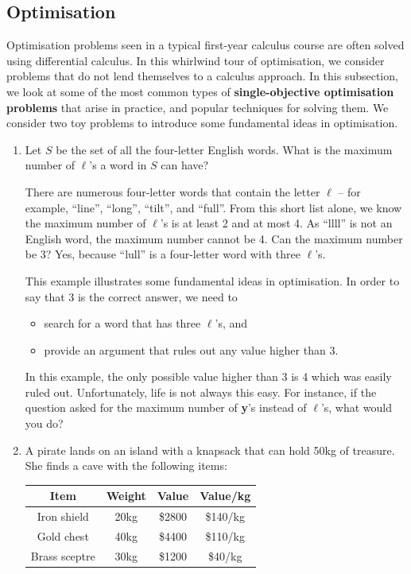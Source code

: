 \subsection{Optimisation}
Optimisation problems seen in a typical first-year calculus course are often solved using differential calculus. In this whirlwind tour of optimisation, we consider problems that do not lend themselves to a calculus approach. In this subsection, we look at some of the most common types of \textbf{single-objective optimisation problems} that arise in practice, and popular techniques for solving them.
\newl We consider two toy problems to introduce some fundamental ideas in
optimisation.

\begin{enumerate}
\def\labelenumi{\arabic{enumi}.}
\item
  Let \(S\) be the set of all the four-letter English words. What is the
  maximum number of \(\ell\)'s a word in \(S\) can have?

  There are numerous four-letter words that contain
  the letter \(\ell\) -- for example, ``line'', ``long'', ``tilt'', and
  ``full''. From this short list alone, we know the maximum number of
  \(\ell\)'s is at least 2 and at most 4. As ``llll'' is not an English
  word, the maximum number cannot be 4. Can the maximum number be 3?
  Yes, because ``lull'' is a four-letter word with three \(\ell\)'s.

  This example illustrates some fundamental ideas in optimisation. In order to say that 3 is the correct answer, we need to \begin{itemize}[noitemsep]
  \item search for a word
  that has three \(\ell\)'s, and 
  \item provide an argument that rules out any
  value higher than 3. \end{itemize}
  In this example, the only possible value higher
  than 3 is 4 which was easily ruled out. Unfortunately, life is not
  always this easy. For instance, if the question asked for the maximum
  number of \textbf{y}'s instead of \(\ell\)'s, what would you do?
\item
  A pirate lands on an island with a knapsack that can hold 50kg of treasure. She finds a cave with the following items:

  \begin{longtable}[]{@{}cccc@{}}
  \toprule
  Item & Weight & Value & Value/kg\tabularnewline
  \midrule
  \endhead
  Iron shield & 20kg & \$2800 & \$140/kg\tabularnewline
  Gold chest & 40kg & \$4400 & \$110/kg\tabularnewline
  Brass sceptre & 30kg & \$1200 & \$40/kg\tabularnewline
  \bottomrule
  \end{longtable}


\end{enumerate}
